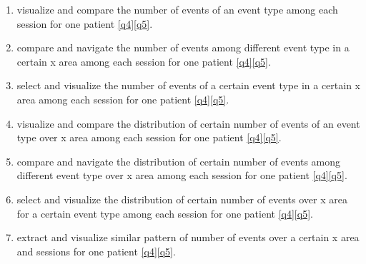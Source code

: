 \newcommand{\test}[2]{$#1 #2$}
\begin{enumerate}[label=\textbf{(\test{T2.}{\arabic*})}]
\item visualize and compare the number of events of an event type among each session for one patient \ref{q4}\ref{q5}.
\item compare and navigate the number of events among different event type in a certain x area among each session for one patient \ref{q4}\ref{q5}.
\item select and visualize the number of events of a certain event type in a certain x area among each session for one patient \ref{q4}\ref{q5}.
\item visualize and compare the distribution of certain number of events of an event type over x area among each session for one patient \ref{q4}\ref{q5}.
\item compare and navigate the distribution of certain number of events among different event type over x area among each session for one patient \ref{q4}\ref{q5}.
\item select and visualize the distribution of certain number of events over x area for a certain event type among each session for one patient \ref{q4}\ref{q5}.
\item extract and visualize similar pattern of number of events over a certain x area and sessions for one patient \ref{q4}\ref{q5}.
\end{enumerate}
